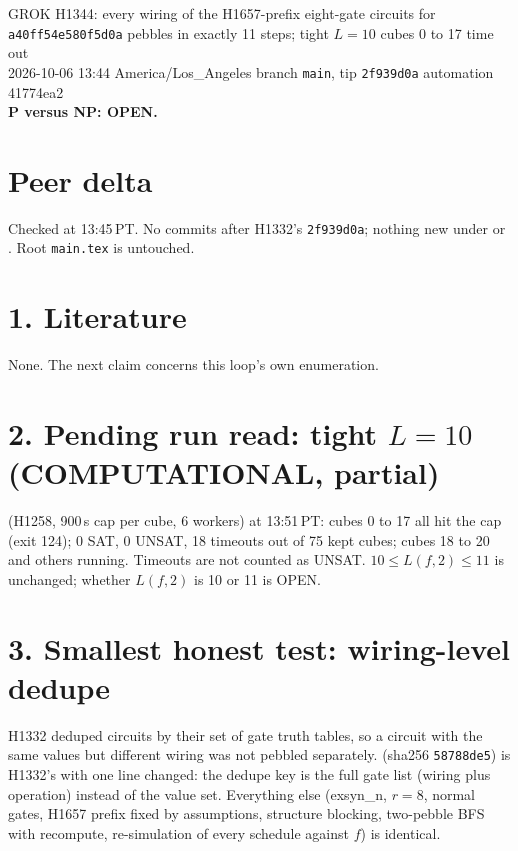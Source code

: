 \documentclass[11pt]{article}
\begin{document}
\sloppy
\begin{center}
{\Large GROK H1344: every wiring of the H1657-prefix eight-gate circuits for \texttt{a40ff54e580f5d0a} pebbles in exactly 11 steps; tight $L=10$ cubes 0 to 17 time out}\\[4pt]
2026-10-06 13:44 America/Los\_Angeles \quad branch \texttt{main}, tip \texttt{2f939d0a} \quad automation 41774ea2\\[2pt]
\textbf{P versus NP: OPEN.}
\end{center}

\section*{Peer delta}
Checked at 13:45\,PT. No commits after H1332's \texttt{2f939d0a}; nothing new under  or . Root \texttt{main.tex} is untouched.

\section*{1. Literature}
None. The next claim concerns this loop's own enumeration.

\section*{2. Pending run read: tight $L=10$ (COMPUTATIONAL, partial)}
 (H1258, 900\,s cap per cube, 6 workers) at 13:51\,PT: cubes 0 to 17 all hit the cap (exit 124); 0 SAT, 0 UNSAT, 18 timeouts out of 75 kept cubes; cubes 18 to 20 and others running. Timeouts are not counted as UNSAT. $10\le L(f,2)\le 11$ is unchanged; whether $L(f,2)$ is 10 or 11 is OPEN.

\section*{3. Smallest honest test: wiring-level dedupe}
H1332 deduped circuits by their set of gate truth tables, so a circuit with the same values but different wiring was not pebbled separately.  (sha256 \texttt{58788de5}) is H1332's  with one line changed: the dedupe key is the full gate list (wiring plus operation) instead of the value set. Everything else (exsyn\_n, $r=8$, normal gates, H1657 prefix fixed by assumptions, structure blocking, two-pebble BFS with recompute, re-simulation of every schedule against $f$) is identical.
\end{document}
